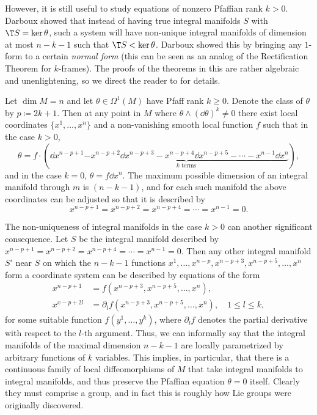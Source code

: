 However, it is still useful to study equations of nonzero Pfaffian rank $k>0$. Darboux showed that instead of having true integral manifolds $S$ with $\T S=\ker\theta$, such a system will have non-unique integral manifolds of dimension at most $n-k-1$ such that $\T S<\ker\theta$. Darboux showed this by bringing any $1$-form to a certain \emph{normal form} (this can be seen as an analog of the Rectification Theorem for $k$-frames). The proofs of the theorems in this \sect{} are rather algebraic and unenlightening, so we direct the reader to \cite{Bryant} for details.

\begin{thm}
    Let $\dim M=n$ and let $\theta\in\Omega^1(M)$ have Pfaff rank $k\geq 0$. Denote the class of $\theta$ by $p\coloneqq 2k+1$. Then at any point in $M$ where $\theta\wedge(\dd\theta)^k\neq 0$ there exist local coordinates $\{x^1,\ldots,x^n\}$ and a non-vanishing smooth local function $f$ such that in the case $k>0$,
    \[\theta=f\cdot (\dd x^{n-p+1}\underbrace{-x^{n-p+2}\dd x^{n-p+3}-x^{n-p+4}\dd x^{n-p+5}-\cdots -x^{n-1}\dd x^n}_{k\text{ terms}}),\]
    and in the case $k=0$, $\theta=f \dd x^n$. The maximum possible dimension of an integral manifold through $m$ is $(n-k-1)$, and for each such manifold the above coordinates can be adjusted so that it is described by 
    \[x^{n-p+1}=x^{n-p+2}=x^{n-p+4}=\cdots=x^{n-1}=0.\]
\end{thm}

The non-uniqueness of integral manifolds in the case $k>0$ can another significant consequence. Let $S$ be the integral manifold described by $x^{n-p+1}=x^{n-p+2}=x^{n-p+4}=\cdots=x^{n-1}=0$. Then any other integral manifold $S'$ near $S$ on which the $n-k-1$ functions $x^1,\ldots,x^{n-p},x^{n-p+3},x^{n-p+5},\ldots,x^n$ form a coordinate system can be described by equations of the form 
\begin{align}
    x^{n-p+1}&=f(x^{n-p+3},x^{n-p+5},\ldots,x^{n}),\\
    x^{x-p+2l}&=\partial_l f(x^{n-p+3},x^{n-p+5},\ldots,x^{n}),\quad 1\leq l\leq k,
\end{align}
for some suitable function $f(y^1,\ldots,y^k)$, where $\partial_l f$ denotes the partial derivative with respect to the $l$-th argument. Thus, we can informally say that the integral manifolds of the maximal dimension $n-k-1$ are locally parametrized by arbitrary functions of $k$ variables. This implies, in particular, that there is a continuous family of local diffeomorphisms of $M$ that take integral manifolds to integral manifolds, and thus preserve the Pfaffian equation $\theta=0$ itself. Clearly they must comprise a group, and in fact this is roughly how Lie groups were originally discovered.

